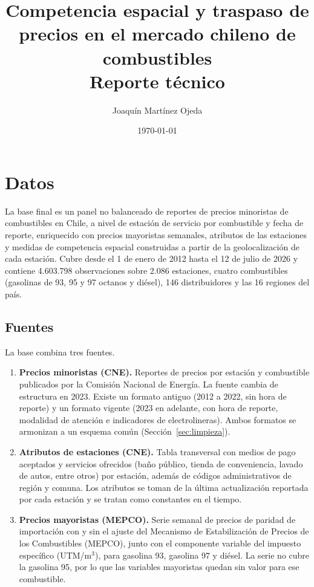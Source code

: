\documentclass[11pt]{article}
\title{Competencia espacial y traspaso de precios en el mercado chileno de combustibles\\[4pt]
\large Reporte técnico}
\author{Joaquín Martínez Ojeda}
\date{\today}
\begin{document}
\maketitle

\section{Datos}
\label{sec:datos}

La base final es un panel no balanceado de reportes de precios minoristas de
combustibles en Chile, a nivel de estación de servicio por combustible y
fecha de reporte, enriquecido con precios mayoristas semanales, atributos de
las estaciones y medidas de competencia espacial construidas a partir de la
geolocalización de cada estación. Cubre desde el 1 de enero de 2012 hasta el
12 de julio de 2026 y contiene 4.603.798 observaciones sobre 2.086
estaciones, cuatro combustibles (gasolinas de 93, 95 y 97 octanos y diésel),
146 distribuidores y las 16 regiones del país.

\subsection{Fuentes}
\label{sec:fuentes}

La base combina tres fuentes.

\begin{enumerate}
  \item \textbf{Precios minoristas (CNE).} Reportes de precios por estación y
  combustible publicados por la Comisión Nacional de Energía. La fuente cambia
  de estructura en 2023. Existe un formato antiguo (2012 a 2022, sin hora de
  reporte) y un formato vigente (2023 en adelante, con hora de reporte,
  modalidad de atención e indicadores de electrolineras). Ambos formatos se
  armonizan a un esquema común (Sección~\ref{sec:limpieza}).
  \item \textbf{Atributos de estaciones (CNE).} Tabla transversal con medios de
  pago aceptados y servicios ofrecidos (baño público, tienda de conveniencia,
  lavado de autos, entre otros) por estación, además de códigos
  administrativos de región y comuna. Los atributos se toman de la última
  actualización reportada por cada estación y se tratan como constantes en el
  tiempo.
  \item \textbf{Precios mayoristas (MEPCO).} Serie semanal de precios de
  paridad de importación con y sin el ajuste del Mecanismo de Estabilización de
  Precios de los Combustibles (MEPCO), junto con el componente variable del
  impuesto específico (UTM/m$^3$), para gasolina 93, gasolina 97 y diésel. La
  serie no cubre la gasolina 95, por lo que las variables mayoristas quedan
  sin valor para ese combustible.
\end{enumerate}
\end{document}
